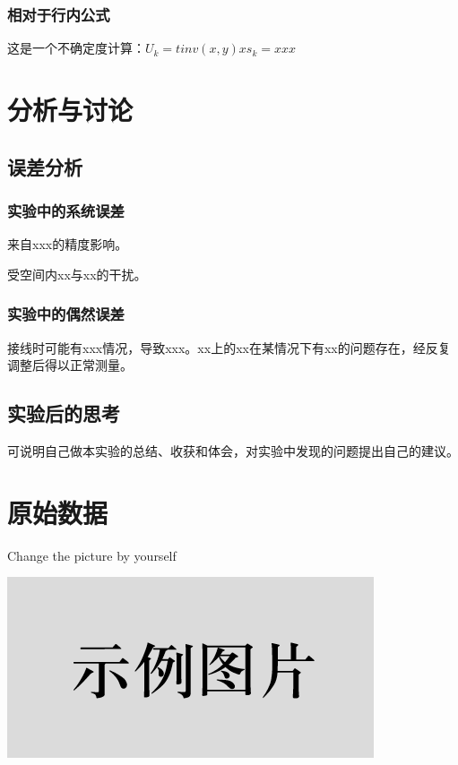 \documentclass[UTF8]{ctexart}
\begin{document}
\subsubsection{相对于行内公式}
这是一个不确定度计算：$U_k=tinv(x,y)xs_k=xxx$


\section{分析与讨论}

\subsection{误差分析}

\subsubsection{实验中的系统误差}
来自xxx的精度影响。

受空间内xx与xx的干扰。

\subsubsection{实验中的偶然误差}
接线时可能有xxx情况，导致xxx。xx上的xx在某情况下有xx的问题存在，经反复调整后得以正常测量。

\subsection{实验后的思考}
可说明自己做本实验的总结、收获和体会，对实验中发现的问题提出自己的建议。

\newpage
\section{原始数据}
\begin{center}
    Change the picture by yourself
    
    
    \includegraphics{picture/example.png}
\end{center}




\end{document}
